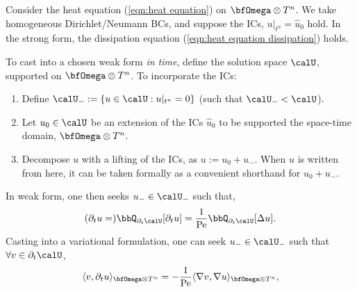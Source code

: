     \begin{example}
      Consider the heat equation (\ref{eqn:heat equation}) on $\bfOmega\otimes T^{n}$. We take homogeneous Dirichlet/Neumann BCs, and suppose the ICs, $u|_{t^{n}}  =  \widehat{u}_{0}$ hold. In the strong form, the dissipation equation (\ref{eqn:heat equation dissipation}) holds.

      To cast into a chosen weak form \emph{in time}, define the solution space $\calU$, supported on $\bfOmega\otimes T^{n}$. To incorporate the ICs:
      \begin{enumerate}
          \item  Define $\calU_{-}  :=  \{u  \in  \calU  :  u|_{t^{n}}  =  0\}$ (such that $\calU_{-}  <  \calU$).
          \item  Let $u_{0}  \in  \calU$ be an extension of the ICs $\widehat{u}_{0}$ to be supported the space-time domain, $\bfOmega\otimes T^{n}$.
          \item  Decompose $u$ with a lifting of the ICs, as $u  :=  u_{0} + u_{-}$. When $u$ is written from here, it can be taken formally as a convenient shorthand for $u_{0} + u_{-}$.
      \end{enumerate}
      In weak form, one then seeks $u_{-}  \in  \calU_{-}$ such that,
      \begin{equation}\label{eqn:heat equation weak form}
          (\partial_{t}u  =)  \bbQ_{\partial_{t}\calU}[\partial_{t}u]  =  \frac{1}{\rmPe}\bbQ_{\partial_{t}\calU}[\Delta u].
      \end{equation}
      Casting into a variational formulation, one can seek $u_{-}  \in  \calU_{-}$ such that $\forall  v  \in  \partial_{t}\calU$,
      \begin{equation}\label{eqn:heat equation variational form}
          \langle v, \partial_{t}u\rangle_{\bfOmega\otimes T^{n}}  =   - \frac{1}{\rmPe}\langle\nabla v, \nabla u\rangle_{\bfOmega\otimes T^{n}},
      \end{equation}
      

\end{example}
